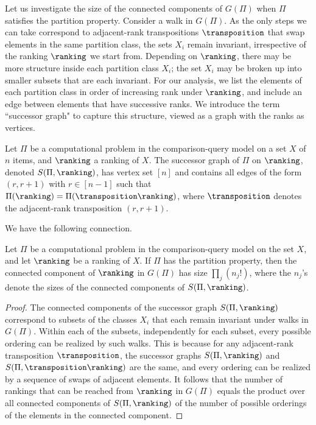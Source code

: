 Let us investigate the size of the connected components of $G(\Pi)$ when $\Pi$ satisfies the partition property. Consider a walk in $G(\Pi)$. As the only steps we can take correspond to adjacent-rank transpositions $\transposition$ that swap elements in the same partition class, the sets $X_i$ remain invariant, irrespective of the ranking $\ranking$ we start from. Depending on $\ranking$, there may be more structure inside each partition class $X_i$; the set $X_i$ may be broken up into smaller subsets that are each invariant. For our analysis, we list the elements of each partition class in order of increasing rank under $\ranking$, and include an edge between elements that have successive ranks. We introduce the term ``successor graph" to capture this structure, viewed as a graph with the ranks as vertices.
\begin{definition}
Let $\Pi$ be a computational problem in the comparison-query model on a set $X$ of $n$ items, and $\ranking$ a ranking of $X$. The successor graph of $\Pi$ on $\ranking$, denoted $S(\Pi,\ranking)$, has vertex set $[n]$ and contains all edges of the form $(r,r+1)$ with $r \in [n-1]$ such that $\Pi(\ranking) = \Pi(\transposition \ranking)$, where $\transposition$ denotes the adjacent-rank transposition $(r,r+1)$.
\end{definition}

We have the following connection.
\begin{proposition}\label{prop:successor:components}
Let $\Pi$ be a computational problem in the comparison-query model on the set $X$, and let $\ranking$ be a ranking of $X$. If $\Pi$ has the partition property, then the connected component of $\ranking$ in $G(\Pi)$ has size $\prod_j (n_j!)$, where the $n_j$'s denote the sizes of the connected components of $S(\Pi,\ranking)$.
\end{proposition}
\begin{proof}
The connected components of the successor graph $S(\Pi,\ranking)$ correspond to subsets of the classes $X_i$ that each remain invariant under walks in $G(\Pi)$. Within each of the subsets, independently for each subset, every possible ordering can be realized by such walks. This is because for any adjacent-rank transposition $\transposition$, the successor graphs $S(\Pi,\ranking)$ and $S(\Pi,\transposition \ranking)$ are the same, and every ordering can be realized by a sequence of swaps of adjacent elements. It follows that the number of rankings that can be reached from $\ranking$ in $G(\Pi)$ equals the product over all connected components of $S(\Pi,\ranking)$ of the number of possible orderings of the elements in the connected component. 
\end{proof}

